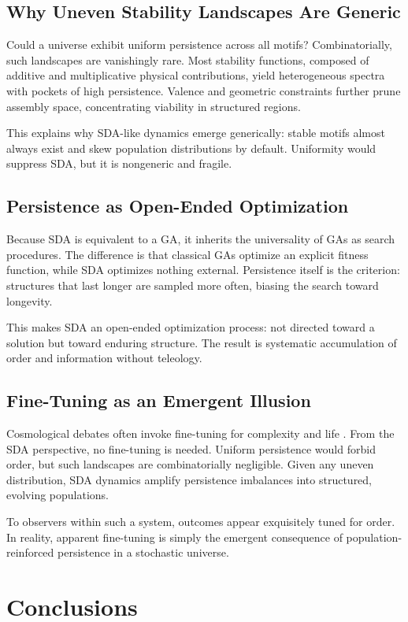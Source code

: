 \documentclass[life,article,submit,pdftex,moreauthors]{Definitions/mdpi}
\begin{document}
\subsection{Why Uneven Stability Landscapes Are Generic}
Could a universe exhibit uniform persistence across all motifs? Combinatorially, such landscapes are vanishingly rare. 
Most stability functions, composed of additive and multiplicative physical contributions, yield heterogeneous spectra with pockets of high persistence. 
Valence and geometric constraints further prune assembly space, concentrating viability in structured regions.  

This explains why SDA-like dynamics emerge generically: stable motifs almost always exist and skew population distributions by default. 
Uniformity would suppress SDA, but it is nongeneric and fragile.  

\subsection{Persistence as Open-Ended Optimization}
Because SDA is equivalent to a GA, it inherits the universality of GAs as search procedures. 
The difference is that classical GAs optimize an explicit fitness function, while SDA optimizes nothing external. 
Persistence itself is the criterion: structures that last longer are sampled more often, biasing the search toward longevity.  

This makes SDA an open-ended optimization process: not directed toward a solution but toward enduring structure. 
The result is systematic accumulation of order and information without teleology.  

\subsection{Fine-Tuning as an Emergent Illusion}
Cosmological debates often invoke fine-tuning for complexity and life \cite{rees2000six, davies2006goldilocks}. 
From the SDA perspective, no fine-tuning is needed. 
Uniform persistence would forbid order, but such landscapes are combinatorially negligible. 
Given any uneven distribution, SDA dynamics amplify persistence imbalances into structured, evolving populations.  

To observers within such a system, outcomes appear exquisitely tuned for order. 
In reality, apparent fine-tuning is simply the emergent consequence of population-reinforced persistence in a stochastic universe.  


\section{Conclusions}
\end{document}
